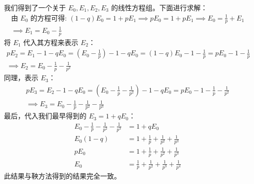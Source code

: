\documentclass[UTF8]{ctexart}
\begin{document}
我们得到了一个关于 $E_0, E_1, E_2, E_3$ 的线性方程组。下面进行求解：
\begin{align*}
    \text{由 } E_0 \text{ 的方程可得: } (1-q)E_0 = 1 + pE_1 \implies pE_0 = 1 + pE_1 \implies E_0 = \frac{1}{p} + E_1 \\
    \implies E_1 = E_0 - \frac{1}{p}
\end{align*}
将 $E_1$ 代入其方程来表示 $E_2$：
\begin{align*}
    pE_2 = E_1 - 1 - qE_0 = (E_0 - \frac{1}{p}) - 1 - qE_0 = (1-q)E_0 - 1 - \frac{1}{p} = pE_0 - 1 - \frac{1}{p} \\
    \implies E_2 = E_0 - \frac{1}{p} - \frac{1}{p^2}
\end{align*}
同理，表示 $E_3$：
\begin{align*}
    pE_3 = E_2 - 1 - qE_0 = (E_0 - \frac{1}{p} - \frac{1}{p^2}) - 1 - qE_0 = pE_0 - 1 - \frac{1}{p} - \frac{1}{p^2} \\
    \implies E_3 = E_0 - \frac{1}{p} - \frac{1}{p^2} - \frac{1}{p^3}
\end{align*}
最后，代入我们最早得到的 $E_3 = 1 + qE_0$：
\begin{align*}
    E_0 - \frac{1}{p} - \frac{1}{p^2} - \frac{1}{p^3} &= 1 + qE_0 \\
    E_0(1-q) &= 1 + \frac{1}{p} + \frac{1}{p^2} + \frac{1}{p^3} \\
    pE_0 &= 1 + \frac{1}{p} + \frac{1}{p^2} + \frac{1}{p^3} \\
    E_0 &= \frac{1}{p} + \frac{1}{p^2} + \frac{1}{p^3} + \frac{1}{p^4}
\end{align*}
此结果与鞅方法得到的结果完全一致。
\fi 
\end{document}
